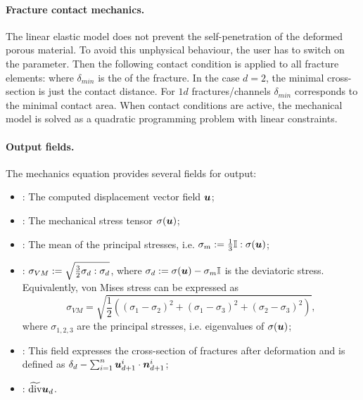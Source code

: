 \paragraph{Fracture contact mechanics.}
The linear elastic model does not prevent the self-penetration of the deformed porous material.
To avoid this unphysical behaviour, the user has to switch on the  parameter.
Then the following contact condition is applied to all fracture elements:
where $\delta_{min}$  is the  of the fracture.
In the case $d=2$, the minimal cross-section is just the contact distance.
For $1d$ fractures/channels $\delta_{min}$ corresponds to the minimal contact area.
When contact conditions are active, the mechanical model is solved as a quadratic programming problem with linear constraints.

\paragraph{Output fields.}
The mechanics equation provides several fields for output:
\begin{itemize}
    \item {}: The computed displacement vector field $\mathbf{\boldsymbol{u}}$;
    \item {}: The mechanical stress tensor ${\mathbb{\sigma}}(\mathbf{\boldsymbol{u}})$;
    \item {}: The mean of the principal stresses, i.e. $\sigma_m:=\frac13{\mathbb{I}}:{\mathbb{\sigma}}(\mathbf{\boldsymbol{u}})$;
    \item {}: $\sigma_{VM}:=\sqrt{\frac32{\mathbb{\sigma}}_d:{\mathbb{\sigma}}_d}$, where ${\mathbb{\sigma}}_d:={\mathbb{\sigma}}(\mathbf{\boldsymbol{u}})-\sigma_m{\mathbb{I}}$ is the deviatoric stress.
    Equivalently, von Mises stress can be expressed as
    \[ \sigma_{VM} = \sqrt{\frac12\left((\sigma_1-\sigma_2)^2+(\sigma_1-\sigma_3)^2+(\sigma_2-\sigma_3)^2\right)}, \]
    where $\sigma_{1,2,3}$ are the principal stresses, i.e. eigenvalues of ${\mathbb{\sigma}}(\mathbf{\boldsymbol{u}})$;
    \item {}: This field expresses the cross-section of fractures after deformation and is defined as $\delta_d-\sum_{i=1}^n\mathbf{\boldsymbol{u}}^i_{d+1}\cdot\mathbf{\boldsymbol{n}}^i_{d+1}$;
    \item {}: $\widetilde{\operatorname{div}}\mathbf{\boldsymbol{u}}_d$.
\end{itemize}

